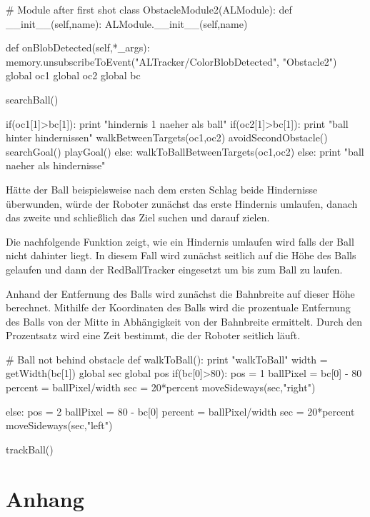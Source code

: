 \documentclass{scrartcl}
\begin{document}
\begin{python}
# Module after first shot
class ObstacleModule2(ALModule):
    def __init__(self,name):
        ALModule.__init__(self,name)

    def onBlobDetected(self,*_args):
        memory.unsubscribeToEvent("ALTracker/ColorBlobDetected",
        	"Obstacle2")
        global oc1
        global oc2
        global bc

        searchBall()
        
        if(oc1[1]>bc[1]):
            print "hindernis 1 naeher als ball"
            if(oc2[1]>bc[1]):
                print "ball hinter hindernissen"
                walkBetweenTargets(oc1,oc2)
                avoidSecondObstacle()
                searchGoal()
                playGoal()
            else:
                walkToBallBetweenTargets(oc1,oc2)
        else:
            print "ball naeher als hindernisse"
            

\end{python} 

Hätte der Ball beispielsweise nach dem ersten Schlag beide Hindernisse überwunden, würde der Roboter zunächst das erste Hindernis umlaufen, danach das zweite und schließlich das Ziel suchen und darauf zielen.

Die nachfolgende Funktion zeigt, wie ein Hindernis umlaufen wird falls der Ball nicht dahinter liegt. In diesem Fall wird zunächst seitlich auf die Höhe des Balls gelaufen und dann der RedBallTracker eingesetzt um bis zum Ball zu laufen.

Anhand der Entfernung des Balls wird zunächst die Bahnbreite auf dieser Höhe berechnet. Mithilfe der Koordinaten des Balls wird die prozentuale Entfernung des Balls von der Mitte in Abhängigkeit von der Bahnbreite ermittelt. Durch den Prozentsatz wird eine Zeit bestimmt, die der Roboter seitlich läuft.


\begin{python}
# Ball not behind obstacle
def walkToBall():
    print "walkToBall"
    width = getWidth(bc[1])
    global sec
    global pos
    if(bc[0]>80):
        pos = 1
        ballPixel = bc[0] - 80
        percent = ballPixel/width
        sec = 20*percent
        moveSideways(sec,"right")

    else:
        pos = 2
        ballPixel = 80 - bc[0]
        percent = ballPixel/width
        sec = 20*percent
        moveSideways(sec,"left")

    trackBall()
\end{python}







  
\appendix 
\section{Anhang}

 

 
 
\end{document}
